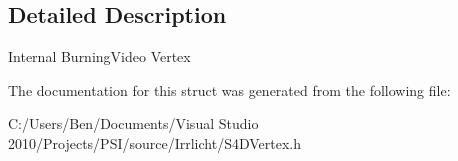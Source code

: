 \subsection{Detailed Description}
Internal Burning\-Video Vertex 

The documentation for this struct was generated from the following file\-:\begin{DoxyCompactItemize}
\item 
C\-:/\-Users/\-Ben/\-Documents/\-Visual Studio 2010/\-Projects/\-P\-S\-I/source/\-Irrlicht/S4\-D\-Vertex.\-h\end{DoxyCompactItemize}
